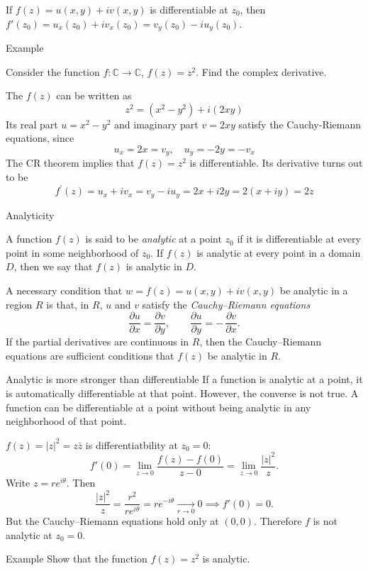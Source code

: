 \documentclass[11pt]{beamer}
\theoremstyle{plain}
\begin{document}
\begin{frame}
    \begin{example}
        If $f(z)=u(x,y)+i v(x,y)$ is differentiable at $z_0$, then $f'(z_0)=u_x(z_0)+i v_x(z_0)=v_y(z_0)-i u_y(z_0)$.
    \end{example}
\end{frame}


\begin{frame}{Example}
    \begin{example}
        Consider the function $f:\mathbb C\rightarrow\mathbb C$, $f(z)=z^2$. Find the complex derivative. 
    \end{example}
    The $f(z)$ can be written as
    $$
        z^2=\left(x^2-y^2\right)+i(2 x y)
    $$
Its real part $u=x^2-y^2$ and imaginary part $v=2 x y$ satisfy the Cauchy-Riemann equations, since
    $$
        u_x=2 x=v_y, \quad u_y=-2 y=-v_x
    $$
The CR theorem implies that $f(z)=z^2$ is differentiable. Its derivative turns out to be
    $$
        f^{\prime}(z)=u_x+i v_x=v_y-i u_y=2 x+i 2 y=2(x+i y)=2 z
    $$
\end{frame}


\begin{frame}{Analyticity}
    \begin{definition}
        A function $f(z)$ is said to be \emph{analytic} at a point $z_0$ if it is differentiable at every point in some neighborhood of $z_0$. If $f(z)$ is analytic at every point in a domain $D$, then we say that $f(z)$ is analytic in $D$.
    \end{definition}
    \begin{theorem}
        A necessary condition that $w=f(z)=u(x,y)+iv(x,y)$ be analytic in a region $R$ is that,
in $R$, $u$ and $v$ satisfy the \emph{Cauchy--Riemann equations}
\[
\frac{\partial u}{\partial x}=\frac{\partial v}{\partial y}, \qquad
\frac{\partial u}{\partial y}=-\,\frac{\partial v}{\partial x}.
\]
If the partial derivatives are continuous in $R$, then the
Cauchy--Riemann equations are sufficient conditions that $f(z)$ be analytic in $R$.
    \end{theorem}
\end{frame}

\begin{frame}{Analytic is more stronger than differentiable}
    If a function is analytic at a point, it is automatically differentiable at that point. However, the converse is not true. A function can be differentiable at a point without being analytic in any neighborhood of that point.
    \begin{example}
$f(z)=|z|^2=z\bar z$ is differentiatbility at \(z_0=0\):
\[
f'(0)=\lim_{z\to 0}\frac{f(z)-f(0)}{z-0}
=\lim_{z\to 0}\frac{|z|^2}{z}.
\]
Write \(z=re^{i\theta}\). Then
\[
\frac{|z|^2}{z}=\frac{r^2}{re^{i\theta}}=re^{-i\theta}\xrightarrow[r\to 0]{}0\implies f'(0)=0.
\]
But the Cauchy--Riemann equations hold only at \((0,0)\). Therefore \(f\) is not analytic at \(z_0=0\).
\end{example}
\end{frame}
\begin{frame}{Example}
Show that the function $f(z)=z^2$ is analytic.
\end{frame}
\end{document}
